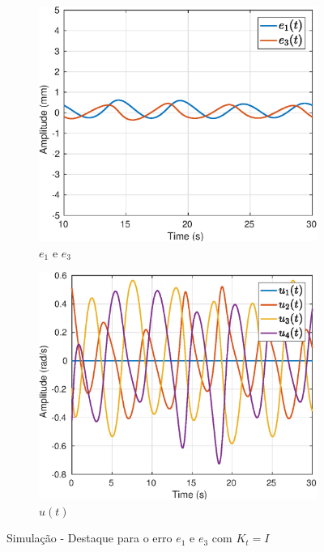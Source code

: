 \begin{figure}[H]
\centering
\begin{subfigure}{.5\textwidth}
  \centering
  \includegraphics[width=\linewidth]{./img/simul_delay_zoh1/error.eps}
  \caption{$e_1$ e $e_3$}
  \label{fig:simul_erro}
\end{subfigure}%
\begin{subfigure}{.5\textwidth}
  \centering
  \includegraphics[width=\linewidth]{./img/simul_delay_zoh1/u.eps}
  \caption{${u}(t)$}
  \label{fig:simul_u}
\end{subfigure}
\caption{Simulação - Destaque para o erro $e_1$ e $e_3$ com ${K}_t = {I}$}
\label{fig:simul_erro_traj}
\end{figure}


